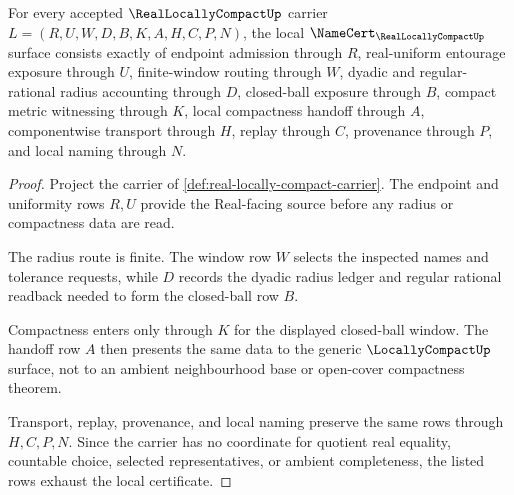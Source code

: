 \begin{theorem}
\label{thm:real-locally-compact-namecert-obligations}
For every accepted $\RealLocallyCompactUp$ carrier $L=(R,U,W,D,B,K,A,H,C,P,N)$, the local $\NameCert_{\RealLocallyCompactUp}$ surface consists exactly of endpoint admission through $R$, real-uniform entourage exposure through $U$, finite-window routing through $W$, dyadic and regular-rational radius accounting through $D$, closed-ball exposure through $B$, compact metric witnessing through $K$, local compactness handoff through $A$, componentwise transport through $H$, replay through $C$, provenance through $P$, and local naming through $N$.
\end{theorem}
\begin{proof}
Project the carrier of \autoref{def:real-locally-compact-carrier}. The endpoint and uniformity rows $R,U$ provide the Real-facing source before any radius or compactness data are read.

The radius route is finite. The window row $W$ selects the inspected names and tolerance requests, while $D$ records the dyadic radius ledger and regular rational readback needed to form the closed-ball row $B$.

Compactness enters only through $K$ for the displayed closed-ball window. The handoff row $A$ then presents the same data to the generic $\LocallyCompactUp$ surface, not to an ambient neighbourhood base or open-cover compactness theorem.

Transport, replay, provenance, and local naming preserve the same rows through $H,C,P,N$. Since the carrier has no coordinate for quotient real equality, countable choice, selected representatives, or ambient completeness, the listed rows exhaust the local certificate.
\end{proof}

